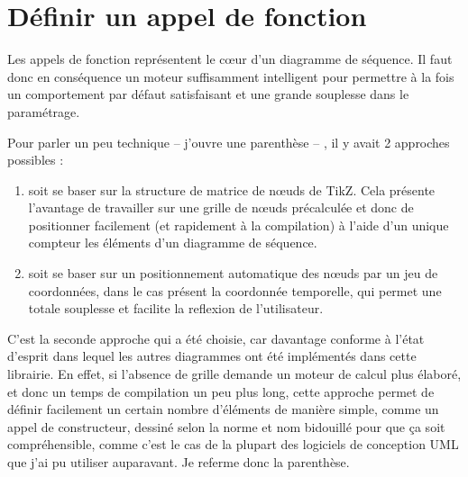 \documentclass[a4paper,11pt]{report}
\newcommand{\inputTikZ}[1]{%
  }%
\newcommand{\inputTikZ}[1]{%
    \texttt{[image: fig/\#1.pdf]}%
  }%
\newcommand{\TikZ}{{\sc TikZ}}
\begin{document}
\medskip

\begin{minipage}{0.5\textwidth}

\end{minipage}
\begin{minipage}{0.5\textwidth}
\begin{center}
\inputTikZ{objectscale}
\end{center}
\end{minipage}

\begin{minipage}{0.5\textwidth}

\end{minipage}
\begin{minipage}{0.5\textwidth}
\begin{center}
\inputTikZ{objectfont}
\end{center}
\end{minipage}

\section{Définir un appel de fonction}\label{s.calls}

Les appels de fonction représentent le c\oe{}ur d'un diagramme de séquence. Il faut donc en conséquence un moteur suffisamment intelligent pour permettre à la fois un comportement par défaut satisfaisant et une grande souplesse dans le paramétrage. 

Pour parler un peu technique -- j'ouvre une parenthèse -- , il y avait 2 approches possibles :

\begin{enumerate}
\item soit se baser sur la structure de matrice de n\oe{}uds de \TikZ. Cela présente l'avantage de travailler sur une grille de n\oe{}uds précalculée et donc de positionner facilement (et rapidement à la compilation) à l'aide d'un unique compteur les éléments d'un diagramme de séquence. 
\item soit se baser sur un positionnement automatique des n\oe{}uds par un jeu de coordonnées, dans le cas présent la coordonnée temporelle, qui permet une totale souplesse et facilite la reflexion de l'utilisateur.
\end{enumerate}

C'est la seconde approche qui a été choisie, car davantage conforme à l'état d'esprit dans lequel les autres diagrammes ont été implémentés dans cette librairie. En effet, si l'absence de grille demande un moteur de calcul plus élaboré, et donc un temps de compilation un peu plus long, cette approche permet de définir facilement un certain nombre d'éléments de manière simple, comme un appel de constructeur, dessiné selon la norme et nom \og bidouillé\fg{} pour que ça soit compréhensible, comme c'est le cas de la plupart des logiciels de conception UML que j'ai pu utiliser auparavant. Je referme donc la parenthèse.
\end{document}
